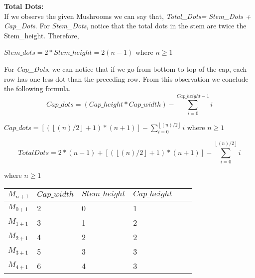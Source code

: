 \documentclass[addpoints]{exam}
\begin{document}
\begin{questions}
\begin{parts}
\begin{solution}
    \textbf{Total Dots:}
    \\
    If we observe the given Mushrooms we can say that, \textit{Total\_Dots= Stem\_Dots + Cap\_Dots}.
    \newline
    For \textit{Stem\_Dots}, notice that the total dots in the stem are twice the Stem\_height. Therefore,
    \begin{center}
        $Stem\_dots = 2 * Stem\_height = 2(n-1)$ \hspace{1cm} where $n \geq 1$
    \end{center}
    
    For \textit{Cap\_Dots}, we can notice that if we go from bottom to top of the cap, each row has one less dot than the preceding row. From this observation we conclude the following formula.\\
    \begin{equation}
        Cap\_dots = (Cap\_height * Cap\_width) - \sum_{i=0}^{Cap\_height -1} i
    \end{equation}
    
    \begin{center}
        $Cap\_dots = [(\left\lfloor(n)/2\right \rfloor+1) * (n+1)] - \sum_{i=0}^{\left\lfloor(n)/2\right \rfloor} i$ \hspace{1cm} where $n \geq 1$
    \end{center}
    
    \begin{equation}
        Total Dots= 2*(n-1) + [(\left\lfloor(n)/2\right \rfloor+1) * (n+1)] - \sum_{i=0}^{\left\lfloor(n)/2\right \rfloor} i
    \end{equation}
    \begin{center}
       where $n \geq 1$
    \end{center}
    
   \end{solution}
   
   \begin{center}
   
   \begin{tabular}{|l|p{}|p{}|p{}|p{}|p{}|}
    \hline
    $M_{n+1}$& $Cap\_width$ & $Stem\_height$ & $Cap\_height$  \\\hline\hline
    $M_{0+1}$	&2 &0 &1 \\\hline
    $M_{1+1}$	&3 &1 &2 \\\hline
    $M_{2+1}$  &4 &2 &2 \\\hline
    $M_{3+1}$	&5 &3 &3 \\\hline
    $M_{4+1}$	&6 &4 &3 \\\hline
    \end{tabular}
    \end{center}
    

\end{parts}
\end{questions}
\end{document}
